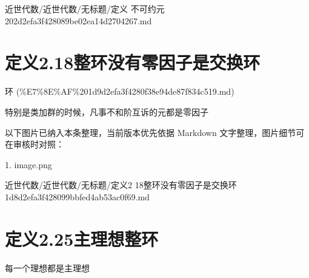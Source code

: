 \begin{note}[来源路径]

近世代数/近世代数/无标题/定义 不可约元 202d2efa3f428089be02ea14d2704267.md

\end{note}

\section*{定义2.18整环没有零因子是交换环}

\begin{note}[来源上级主题]

环 (\%E7\%8E\%AF\%201d9d2efa3f4280f38e94de87f834c519.md)

\end{note}

\begin{definition}[定义2.18整环没有零因子是交换环]

特别是类加群的时候，凡事不和阶互诉的元都是零因子

\end{definition}

\begin{note}[关联图片]
以下图片已纳入本条整理，当前版本优先依据 Markdown 文字整理，图片细节可在审核时对照：

1. image.png\\

\end{note}

\begin{note}[来源路径]

近世代数/近世代数/无标题/定义2 18整环没有零因子是交换环 1d8d2efa3f428099bbfed4ab53ac0f69.md

\end{note}

\section*{定义2.25主理想整环}

\begin{definition}[定义2.25主理想整环]

每一个理想都是主理想

\end{definition}

